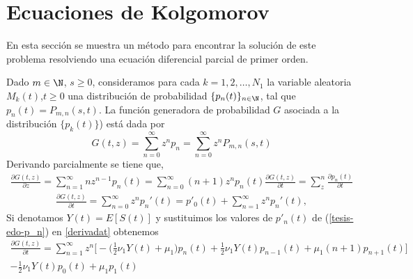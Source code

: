 \section{Ecuaciones de Kolgomorov}
\begin{comment}
    Usando la ecuación de Chapman-Kolgomorov se obtiene que
    $$P_{m,n}(s,t)=\sum_{k=0}^\infty P_{m,k}(s,u)P_{k,n}(u,t),$$
    $$\Pi_{i,j}(s,t)=\sum_{k=0}^{N_2} \Pi_{i,k}(s,u)\Pi_{k,j}(u,t),$$
\end{comment}

En esta sección se muestra un método para encontrar la solución de este problema resolviendo una ecuación diferencial parcial de primer orden.

Dado $m\in\N$, $s\geq 0$, consideramos para cada $k=1,2,\ldots,N_1$ la variable aleatoria $M_k(t)$,$t\geq 0$ una distribución de probabilidad $\{p_n(t)\}_{n\in\N}$, tal que $p_n(t)=P_{m,n}(s,t)$. La función generadora de probabilidad $G$ asociada a la distribución $\{p_k(t)\}$) está dada por
\begin{equation}
    G(t,z)=\sum_{n=0}^\infty z^n p_n=\sum_{n=0}^\infty z^n P_{m,n}(s,t)\label{tesis-funcGeneradoraDeM}
\end{equation}
Derivando parcialmente se tiene que,
\begin{eqnarray}
  \label{derivadat}
    \frac{\partial G(t,z)}{\partial z}=\sum_{n=1}^\infty n z^{n-1}p_n(t)=\sum_{n=0}^\infty (n+1)z^{n}p_n(t)
    \frac{\partial G(t,z)}{\partial t} = \sum_z^n \frac{\partial p_n(t)}{\partial t}
\end{eqnarray}
\begin{eqnarray}
    \frac{\partial G(t,z)}{\partial t}=\sum_{n=0}^\infty z^n p_n'(t)=p'_0(t)+\sum_{n=1}^\infty z^n p_n'(t),
\end{eqnarray}
Si denotamos $Y(t)=E[S(t)]$ y sustituimos los valores de $p'_n(t)$ de (\ref{tesis-edo-p_n}) en  \ref{derivadat} obtenemos
\begin{eqnarray*}
    \frac{\partial G(t,z)}{\partial t} =\sum_{n=1}^\infty z^n\bigg[-\bigg(\frac{1}{2}\nu_1Y(t)+\mu_1\bigg)p_n(t)+\frac{1}{2}\nu_1Y(t)p_{n-1}(t)+\mu_1(n+1)p_{n+1}(t)\bigg]\\-\frac{1}{2}\nu_1Y(t)p_0(t)+\mu_1 p_1(t)
\end{eqnarray*}
